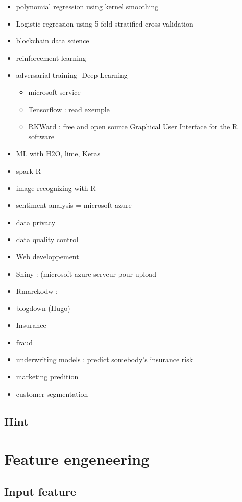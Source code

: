\documentclass[]{book}
\providecommand{\tightlist}{%
  \setlength{\itemsep}{0pt}\setlength{\parskip}{0pt}}
\theoremstyle{definition}
\theoremstyle{definition}
\theoremstyle{definition}
\theoremstyle{remark}
\begin{document}
\begin{itemize}
\item
  polynomial regression using kernel smoothing
\item
  Logistic regression using 5 fold stratified cross validation
\item
  blockchain data science
\item
  reinforcement learning
\item
  adversarial training -Deep Learning

  \begin{itemize}
  \tightlist
  \item
    microsoft service
  \item
    Tensorflow : read exemple
  \item
    RKWard : free and open source Graphical User Interface for the R
    software
  \end{itemize}
\item
  ML with H2O, lime, Keras
\item
  spark R
\item
  image recognizing with R
\item
  sentiment analysis = microsoft azure
\item
  data privacy
\item
  data quality control
\item
  Web developpement
\item
  Shiny : (microsoft azure serveur pour upload
\item
  Rmarckodw :
\item
  blogdown (Hugo)
\item
  Insurance
\item
  fraud
\item
  underwriting models : predict somebody's insurance risk
\item
  marketing predition
\item
  customer segmentation
\end{itemize}

\section{Hint}\label{hint}

\chapter{Feature engeneering}\label{feature-engeneering}

\section{Input feature}\label{input-feature}
\end{document}
